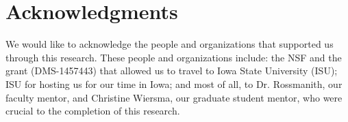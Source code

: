 
\section*{Acknowledgments}

We would like to acknowledge the people and organizations that supported us through this research.
These people and organizations include: the NSF and the grant (DMS-1457443) that allowed us to travel to Iowa State University (ISU); ISU for hosting us for our time in Iowa; and most of all, to Dr. Rossmanith, our faculty mentor, and Christine Wiersma, our graduate student mentor, who were crucial to the completion of this research. 